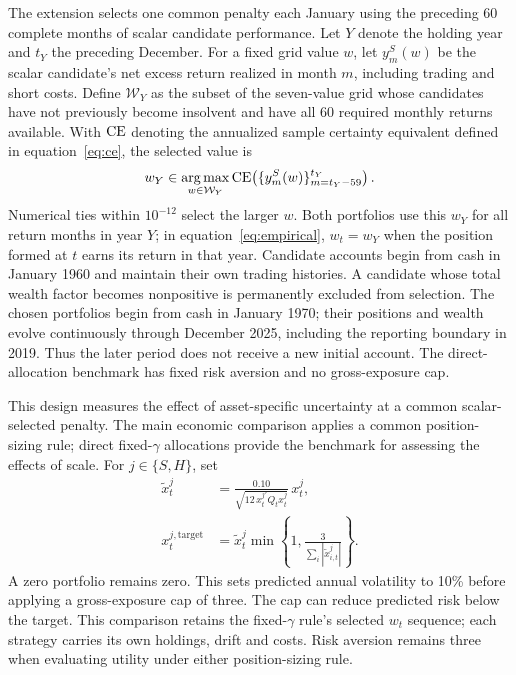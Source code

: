 The extension selects one common penalty each January using the preceding 60 complete months of scalar candidate performance. Let $Y$ denote the holding year and $t_Y$ the preceding December. For a fixed grid value $w$, let $y_m^S(w)$ be the scalar candidate's net excess return realized in month $m$, including trading and short costs. Define $\mathcal W_Y$ as the subset of the seven-value grid whose candidates have not previously become insolvent and have all 60 required monthly returns available. With $\operatorname{CE}$ denoting the annualized sample certainty equivalent defined in equation~\eqref{eq:ce}, the selected value is
\begin{equation}
w_Y\in\operatorname*{arg\,max}_{w\in\mathcal W_Y}
\operatorname{CE}\!\left(\{y_m^S(w)\}_{m=t_Y-59}^{t_Y}\right).
\label{eq:common-selection}
\end{equation}
Numerical ties within $10^{-12}$ select the larger $w$. Both portfolios use this $w_Y$ for all return months in year $Y$; in equation~\eqref{eq:empirical}, $w_t=w_Y$ when the position formed at $t$ earns its return in that year. Candidate accounts begin from cash in January 1960 and maintain their own trading histories. A candidate whose total wealth factor becomes nonpositive is permanently excluded from selection. The chosen portfolios begin from cash in January 1970; their positions and wealth evolve continuously through December 2025, including the reporting boundary in 2019. Thus the later period does not receive a new initial account. The direct-allocation benchmark has fixed risk aversion and no gross-exposure cap.

This design measures the effect of asset-specific uncertainty at a common scalar-selected penalty. The main economic comparison applies a common position-sizing rule; direct fixed-$\gamma$ allocations provide the benchmark for assessing the effects of scale. For $j\in\{S,H\}$, set
\begin{equation}
\begin{aligned}
\widetilde x_t^j&=\frac{0.10}{\sqrt{12\,x_t^{j\prime}Q_tx_t^j}}\,x_t^j,\\
x_t^{j,\mathrm{target}}&=\widetilde x_t^j\min\left\{1,\frac{3}{\sum_i|\widetilde x_{i,t}^j|}\right\}.
\end{aligned}
\label{eq:deployment}
\end{equation}
A zero portfolio remains zero. This sets predicted annual volatility to 10\% before applying a gross-exposure cap of three. The cap can reduce predicted risk below the target. This comparison retains the fixed-$\gamma$ rule's selected $w_t$ sequence; each strategy carries its own holdings, drift and costs. Risk aversion remains three when evaluating utility under either position-sizing rule.

